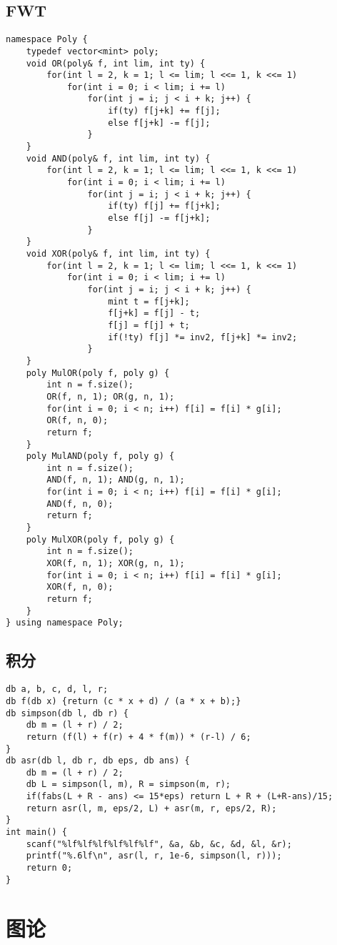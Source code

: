 \documentclass{article}
\begin{document}
\subsection{FWT}
\begin{lstlisting}
namespace Poly {
	typedef vector<mint> poly;
	void OR(poly& f, int lim, int ty) {
		for(int l = 2, k = 1; l <= lim; l <<= 1, k <<= 1)
			for(int i = 0; i < lim; i += l)
				for(int j = i; j < i + k; j++) {
					if(ty) f[j+k] += f[j];
					else f[j+k] -= f[j];
				}
	}
	void AND(poly& f, int lim, int ty) {
		for(int l = 2, k = 1; l <= lim; l <<= 1, k <<= 1)
			for(int i = 0; i < lim; i += l)
				for(int j = i; j < i + k; j++) {
					if(ty) f[j] += f[j+k];
					else f[j] -= f[j+k];
				}
	}
	void XOR(poly& f, int lim, int ty) {
		for(int l = 2, k = 1; l <= lim; l <<= 1, k <<= 1)
			for(int i = 0; i < lim; i += l)
				for(int j = i; j < i + k; j++) {
					mint t = f[j+k];
					f[j+k] = f[j] - t;
					f[j] = f[j] + t;
					if(!ty) f[j] *= inv2, f[j+k] *= inv2;
				}
	}
	poly MulOR(poly f, poly g) {
		int n = f.size();
		OR(f, n, 1); OR(g, n, 1);
		for(int i = 0; i < n; i++) f[i] = f[i] * g[i];
		OR(f, n, 0);
		return f;
	}
	poly MulAND(poly f, poly g) {
		int n = f.size();
		AND(f, n, 1); AND(g, n, 1);
		for(int i = 0; i < n; i++) f[i] = f[i] * g[i];
		AND(f, n, 0);
		return f;
	}
	poly MulXOR(poly f, poly g) {
		int n = f.size();
		XOR(f, n, 1); XOR(g, n, 1);
		for(int i = 0; i < n; i++) f[i] = f[i] * g[i];
		XOR(f, n, 0);
		return f;
	}
} using namespace Poly;

\end{lstlisting}
   \subsection{积分}
   \begin{lstlisting}
db a, b, c, d, l, r;
db f(db x) {return (c * x + d) / (a * x + b);}
db simpson(db l, db r) {
	db m = (l + r) / 2;
	return (f(l) + f(r) + 4 * f(m)) * (r-l) / 6;
}
db asr(db l, db r, db eps, db ans) {
	db m = (l + r) / 2;
	db L = simpson(l, m), R = simpson(m, r);
	if(fabs(L + R - ans) <= 15*eps) return L + R + (L+R-ans)/15;
	return asr(l, m, eps/2, L) + asr(m, r, eps/2, R);
}
int main() {
	scanf("%lf%lf%lf%lf%lf%lf", &a, &b, &c, &d, &l, &r);
	printf("%.6lf\n", asr(l, r, 1e-6, simpson(l, r)));
	return 0;
}
   \end{lstlisting}
    \section{图论}
\end{document}
